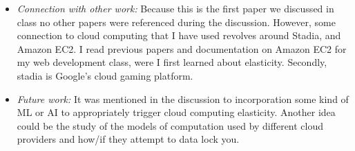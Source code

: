 \documentclass[letterpaper,twocolumn,10pt]{article}
\begin{document}
\begin{itemize}
\item {\it Connection with other work:}
Because this is the first paper we discussed in class no other papers were referenced during the discussion. However, 
some connection to cloud computing that I have used revolves around Stadia, and Amazon EC2. I read previous papers
and documentation on Amazon EC2 for my web development class, were I first learned about elasticity. Secondly, stadia
is Google's cloud gaming platform.  

\item {\it Future work:} 
It was mentioned in the discussion to incorporation some kind of ML or AI to appropriately trigger cloud computing elasticity.
Another idea could be the study of the models of computation used by different cloud providers and how/if they attempt to data lock you. 

\end{itemize}
\end{document}
